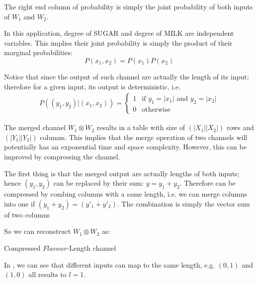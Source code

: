 \begin{example}
The right end column of probability is simply the joint probability of both inputs of $W_1$ and $W_2$. 

In this application, degree of SUGAR and degree of MILK are independent variables. This implies their joint probability is simply the product of their marginal probabilities:
\begin{equation}
P(x_1, x_2) = P(x_1) P(x_2)
\end{equation}

Notice that since the output of such channel are actually the length of its input; therefore for a given input, its output is deterministic, i.e.
\begin{eqnarray} 
P((y_1,y_2)|(x_1,x_2)) =
	\begin{cases}
	1 &\text{if } y_1 = |x_1| \text{ and } y_2 = |x_2| \\
	0 &\text{otherwise}
	\end{cases}
\label{Eq: Length Probability}
\end{eqnarray}

The merged channel $W_1 \otimes W_2$ results in a table with size of $(|X_1||X_2|)$ rows and $(|Y_1| |Y_2|)$ columns. This implies that the merge operation of two channels will potentially has an exponential time and space complexity. However, this can be improved by compressing the channel.

The first thing is that the merged output are actually lengths of both inputs; hence $(y_1, y_2)$ can be replaced by their sum: $y = y_1 + y_2$. Therefore  can be compressed by combing columns with a same length, i.e. we can merge columns into one if $(y_1 + y_2) = (y\prime_1 + y\prime_2)$. The combination is simply the vector sum of two columns

So we can reconstruct $W_1 \otimes W_2$ as:
\begin{table}[H]
\begin{center}
{}
\end{center}
\caption{Compressed $Flavour$-Length channel}
\label{Tbl: Compressed Flavour}
\end{table}

In , we can see that different inputs can map to the same length, e.g. $(0,1)$ and $(1,0)$ all results to $l = 1$.


\end{example}
